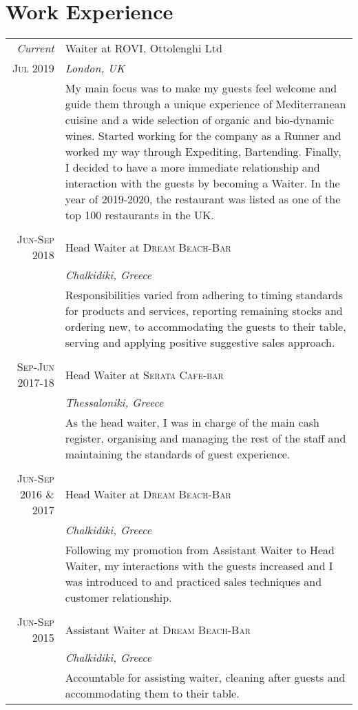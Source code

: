 \documentclass[a4paper,10pt]{article}
\begin{document}
\section{Work Experience}
\begin{tabular}{r|p{11cm}}
 \emph{Current} & Waiter at \textsc{ROVI}, Ottolenghi Ltd \\\textsc{Jul 2019} &\emph{London, UK}\\&\footnotesize{My main focus was to make my guests feel welcome and guide them through a unique experience of Mediterranean cuisine and a wide selection of organic and bio-dynamic wines. Started working for the company as a Runner and worked my way through Expediting, Bartending. Finally, I decided to have a more immediate relationship and interaction with the guests by becoming a Waiter. In the year of 2019-2020, the restaurant was listed as one of the top 100 restaurants in the UK.}\\\multicolumn{2}{c}{} \\
 \textsc{Jun-Sep 2018} & Head Waiter at \textsc{Dream Beach-Bar} \\&\emph{Chalkidiki, Greece}\\&\footnotesize{Responsibilities varied from adhering to timing standards for products and services, reporting remaining stocks and ordering new, to accommodating the guests to their table, serving and applying positive suggestive sales approach.}\\\multicolumn{2}{c}{} \\
\textsc{Sep-Jun 2017-18} & Head Waiter at \textsc{Serata Cafe-bar} \\&\emph{Thessaloniki, Greece}\\&\footnotesize{As the head waiter, I was in charge of the main cash register, organising and managing the rest of the staff and maintaining the standards of guest experience.}\\\multicolumn{2}{c}{} \\
\textsc{Jun-Sep 2016 \& 2017} & Head Waiter at \textsc{Dream Beach-Bar} \\&\emph{Chalkidiki, Greece}\\&\footnotesize{Following my promotion from Assistant Waiter to Head Waiter, my interactions with the guests increased and I was introduced to and practiced sales techniques and customer relationship.}\\\multicolumn{2}{c}{} \\
\textsc{Jun-Sep 2015} & Assistant Waiter at \textsc{Dream Beach-Bar} \\&\emph{Chalkidiki, Greece}\\&\footnotesize{Accountable for assisting waiter, cleaning after guests and accommodating them to their table.}
\end{tabular} \\ \\
\end{document}
